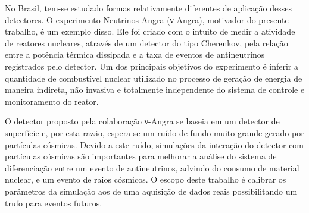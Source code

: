 No Brasil, tem-se estudado formas relativamente diferentes de aplicação  desses detectores. O experimento Neutrinos-Angra (ν-Angra), motivador do presente trabalho, é um exemplo disso. Ele foi criado com o intuito de medir a atividade de reatores nucleares, através de um detector do tipo Cherenkov, pela relação entre a  potência térmica dissipada e a taxa de eventos de antineutrinos registrados pelo detector. Um dos principais objetivos do experimento é inferir a quantidade de combustível nuclear utilizado no processo de geração de energia de maneira indireta, não invasiva e totalmente independente do sistema de controle e monitoramento do reator. 

O detector proposto pela colaboração ν-Angra se baseia em um detector de superfície e, por esta razão, espera-se um ruído de fundo muito grande gerado por partículas cósmicas. Devido a este ruído, simulações da interação do detector com partículas cósmicas são importantes para melhorar a análise do sistema de diferenciação entre um evento de antineutrinos, advindo do consumo de material nuclear, e um evento de raios cósmicos.
O escopo deste trabalho é calibrar os parâmetros da simulação aos de uma aquisição de dados reais possibilitando um trufo para eventos futuros.



%
%
%
%

